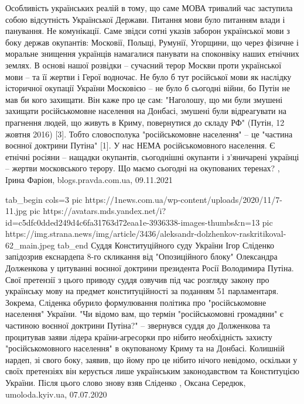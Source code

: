  
 
 
 
 

Особливість українських реалій в тому, що саме МОВА тривалий час заступила
собою відсутність Української Держави. Питання мови було питанням влади і
панування. Не комунікації. Саме звідси сотні указів заборон української мови з
боку держав окупантів: Московії, Польщі, Румунії, Угорщини, що через фізичне і
моральне знищення українців намагалися панувати на споконвіку наших етнічних
землях.  В основі нашої розвідки – сучасний терор Москви проти української мови
– та її жертви і Герої водночас. Не було б тут російської мови як наслідку
історичної окупації України Московією – не було б сьогодні війни, бо Путін не
мав би кого захищати. Він каже про це сам: "Наголошу, що ми були змушені
захищати російськомовне населення на Донбасі, змушені були відреагувати на
прагнення людей, що живуть в Криму, повернутися до складу РФ" (Путін, 12 жовтня
2016) [3].  Тобто словосполука "російськомовне населення" – це "частина воєнної
доктрини Путіна" [1]. У нас НЕМА російськомовного населення. Є етнічні росіяни
– нащадки окупантів, сьогоднішні окупанти і з'яничарені українці – жертви
московського терору.  Що маємо сьогодні на окупованих теренах?
, 
Ірина Фаріон, blogs.pravda.com.ua, 09.11.2021


\ifcmt
  tab_begin cols=3
		 pic https://1news.com.ua/wp-content/uploads/2020/11/7-11.jpg
     pic https://avatars.mds.yandex.net/i?id=c5dfc0dded249d4c6fa31763d72eaa1e-3936338-images-thumbs&n=13
		 pic https://img.strana.news/img/article/3436/aleksandr-dolzhenkov-raskritikoval-62_main.jpeg
  tab_end
\fi
Суддя Конституційного суду України Ігор Сліденко запідозрив екснардепа 8-го
скликання від "Опозиційного блоку" Олександра Долженкова у цитуванні воєнної
доктрини президента Росії Володимира Путіна.  Свої претензії з цього приводу
суддя озвучив під час розгляду закону про українську мову на предмет
конституційності за поданням 51 парламентаря.  Зокрема, Сліденка обурило
формулювання політика про "російськомовне населення" України.  "Чи відомо вам,
що термін "російськомовні громадяни" є частиною воєнної доктрини Путіна?" –
звернувся суддя до Долженкова та процитував заяви лідера країни-агресорки про
нібито необхідність захисту "російськомовного населення" в окупованому Криму та
на Донбасі.  Колишній нардеп, зі свого боку, заявив, що йому про це нібито
нічого невідомо, оскільки у своїх претензіях він керується лише українським
законодавством та Конституцією України. Після цього слово знову взяв Сліденко
, 
Оксана Середюк, umoloda.kyiv.ua, 07.07.2020
